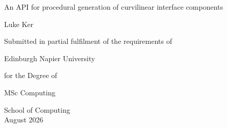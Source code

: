 


\thispagestyle{empty}


\begin{center}


\vspace{1.5cm}

{\huge An API for procedural generation of curvilinear interface components}

\vspace{1.5cm}

{\Large Luke Ker}



\vspace{4cm}




{\Large Submitted in partial fulfilment of the requirements of}

{\Large Edinburgh Napier University}

{\Large for the Degree of}

{\Large MSc Computing}

\vspace{0.5cm}

{\Large }


\vspace{3cm}

{\Large School of Computing}\\
\vspace{1.5cm}
{\Large August 2026}

\end{center}